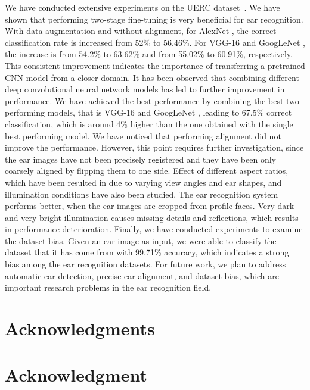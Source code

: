 \documentclass[11pt,journal,compsoc]{IEEEtran}
\begin{document}
We have conducted extensive experiments on the UERC dataset~\cite{Emersic_2017_b}. We have shown that performing two-stage fine-tuning is very beneficial for ear recognition. With data augmentation and without alignment, for AlexNet \cite{Krizhevsky_2012}, the correct classification rate is increased from 52\% to 56.46\%. For VGG-16 \cite{Simonyan_2014} and GoogLeNet \cite{Szegedy_2015}, the increase is from 54.2\% to 63.62\% and from 55.02\% to 60.91\%, respectively. This consistent improvement indicates the importance of transferring a pretrained CNN model from a closer domain. It has been observed that combining different deep convolutional neural network models has led to further improvement in performance. We have achieved the best performance by combining the best two performing models, that is VGG-16 \cite{Simonyan_2014} and GoogLeNet \cite{Szegedy_2015}, leading to 67.5\% correct classification, which is around 4\% higher than the one obtained with the single best performing model. We have noticed that performing alignment did not improve the performance. However, this point requires further investigation, since the ear images have not been precisely registered and they have been only coarsely aligned by flipping them to one side. Effect of different aspect ratios, which have been resulted in due to varying view angles and ear shapes, and illumination conditions have also been studied. The ear recognition system performs better, when the ear images are cropped from profile faces. Very dark and very bright illumination causes missing details and reflections, which results in performance deterioration. Finally, we have conducted experiments to examine the dataset bias. Given an ear image as input, we were able to classify the dataset that it has come from with 99.71\% accuracy, which indicates a strong bias among the ear recognition datasets. For future work, we plan to address automatic ear detection, precise ear alignment, and dataset bias, which are important research problems in the ear recognition field.

\IEEEpubidadjcol

\ifCLASSOPTIONcompsoc
  \section*{Acknowledgments}
\else
  \section*{Acknowledgment}
\fi
\end{document}
